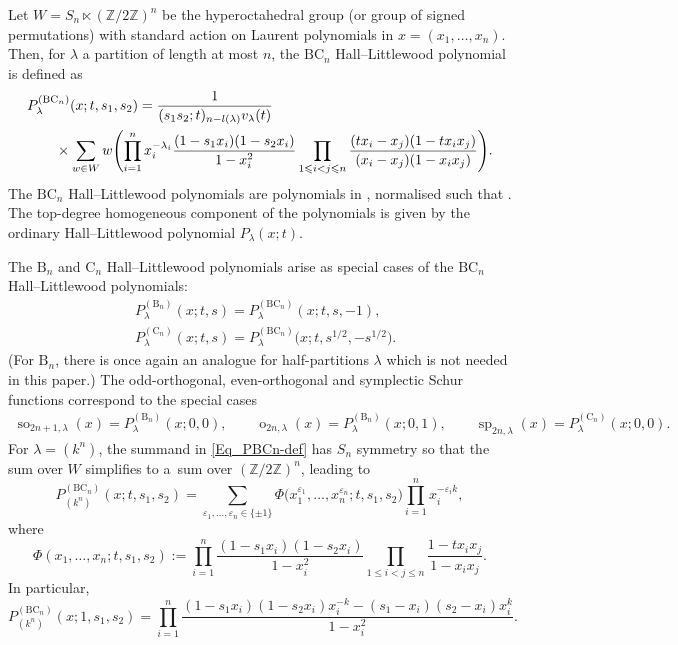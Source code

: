 \documentclass[pdftex]{sigma}
\numberwithin{equation}{section}
\renewcommand{\leq}{\leqslant}
\DeclareMathOperator{\symp}{sp}
\DeclareMathOperator{\so}{so}
\DeclareMathOperator{\oeven}{o}
\newcommand{\la}{\lambda}
\begin{document}
Let $W=S_n\ltimes (\mathbb{Z}/2\mathbb{Z})^n$ be the hyperoctahedral group
(or group of signed permutations) with standard action on Laurent
polynomials in $x=(x_1,\dots,x_n)$.
Then, for $\la$ a partition of length at most $n$, the
$\mathrm{BC}_n$ Hall--Littlewood polynomial
\smash{$P^{\mathrm{BC}_n}_{\la}(x;t,s_1,s_2)$} is defined as
\cite{Macdonald00,Venkateswaran15}
\begin{align}
&P^{(\mathrm{BC}_n)}_{\la}(x;t,s_1,s_2)
=\frac{1}{(s_1s_2;t)_{n-l(\la)}v_{\la}(t)} \notag \\
& \qquad{}\times
\sum_{w\in W} w\Biggl( \prod_{i=1}^n x_i^{-\la_i}
\frac{(1-s_1x_i)(1-s_2x_i)}{1-x_i^2} \prod_{1\leq i<j\leq n}
\frac{(tx_i-x_j)(1-tx_ix_j)}{(x_i-x_j)(1-x_ix_j)}\Biggr).
\label{Eq_PBCn-def}
\end{align}
The $\mathrm{BC}_n$ Hall--Littlewood polynomials
are polynomials in
,
normalised such that
.
The top-degree homogeneous component of the polynomials
\smash{$P^{(\mathrm{BC}_n)}_{\la}(x;t,s_1,s_2)$}
is given by the ordinary Hall--Littlewood polynomial $P_{\la}(x;t)$.

The $\mathrm{B}_n$ and $\mathrm{C}_n$ Hall--Littlewood polynomials
arise as special cases of the $\mathrm{BC}_n$ Hall--Littlewood
polynomials:
\begin{subequations}
\begin{align}
\label{Eq_BCn_to_Bn}
&P^{(\mathrm{B}_n)}_{\la}(x;t,s)=
P^{(\mathrm{BC}_n)}_{\la}(x;t,s,-1) ,\\
&P^{(\mathrm{C}_n)}_{\la}(x;t,s)=
P^{(\mathrm{BC}_n)}_{\la}\bigl(x;t,s^{1/2},-s^{1/2}\bigr).
\label{Eq_BCn_to_Cn}
\end{align}
\end{subequations}
(For $\mathrm{B}_n$, there is once again an analogue for half-partitions $\la$
which is not needed in this paper.)
The odd-orthogonal, even-orthogonal and symplectic Schur functions
correspond to the special cases
\begin{gather*}
\so_{2n+1,\la}(x)=P^{(\mathrm{B}_n)}_{\la}(x;0,0), \qquad
\oeven_{2n,\la}(x)=P^{(\mathrm{B}_n)}_{\la}(x;0,1),
\qquad
\symp_{2n,\la}(x)=P^{(\mathrm{C}_n)}_{\la}(x;0,0).
\end{gather*}
For $\la=(k^n)$, the summand in \eqref{Eq_PBCn-def}
has $S_n$ symmetry so that
the sum over $W$ simplifies to a~sum over $(\mathbb{Z}/2\mathbb{Z})^n$,
leading to \cite[Lemma 2.5]{RW21}
\[
P^{(\mathrm{BC}_n)}_{(k^n)}(x;t,s_1,s_2)
=\sum_{\varepsilon_1,\dots,\varepsilon_n\in \{\pm 1\}}
\Phi\bigl(x_1^{\varepsilon_1},\dots,x_n^{\varepsilon_n};t,s_1,s_2\bigr)
\prod_{i=1}^n x_i^{-\varepsilon_i k},
\]
where
\[
\Phi(x_1,\dots,x_n;t,s_1,s_2):=
\prod_{i=1}^n \frac{(1-s_1x_i)(1-s_2x_i)}{1-x_i^2}
\prod_{1\leq i<j\leq n}\frac{1-tx_ix_j}{1-x_ix_j}.
\]
In particular,
\begin{equation}\label{Eq_PBCnt1}
P^{(\mathrm{BC}_n)}_{(k^n)}(x;1,s_1,s_2)
=\prod_{i=1}^n
\frac{(1-s_1x_i)(1-s_2x_i)x_i^{-k}
-(s_1-x_i)(s_2-x_i)x_i^k}{1-x_i^2}.
\end{equation}
\end{document}
